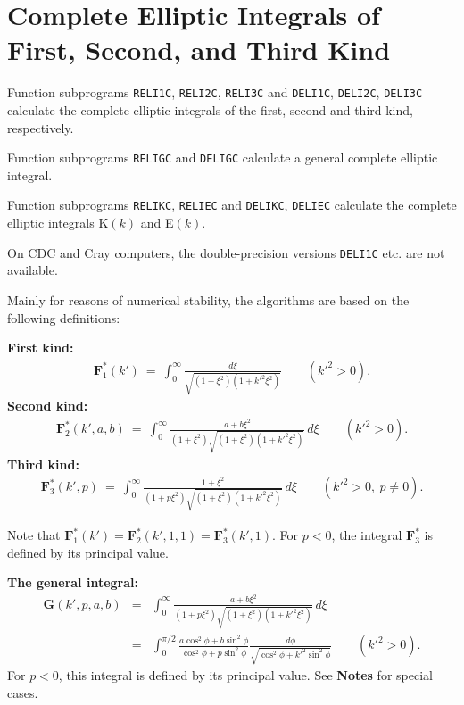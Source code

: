 \documentclass[]{article}
\begin{document}
\section{Complete Elliptic Integrals of First, Second, and Third
Kind}
Function subprograms \texttt{RELI1C}, \texttt{RELI2C}, \texttt{RELI3C}
and \texttt{DELI1C}, \texttt{DELI2C}, \texttt{DELI3C} calculate
the complete elliptic integrals of the first, second and
third kind, respectively.

Function subprograms \texttt{RELIGC} and \texttt{DELIGC} calculate a general
complete elliptic integral.

Function subprograms \texttt{RELIKC}, \texttt{RELIEC} and \texttt{DELIKC},
\texttt{DELIEC} calculate the complete elliptic integrals K$(k)$ and
E$(k)$.

On CDC and Cray computers, the double-precision versions \texttt{DELI1C}
etc. are not available.

Mainly for reasons of numerical stability, the algorithms are based on
the following definitions:

\textbf{First kind:}
\begin{eqnarray*}
\mathbf{F}_1^*(k') \ = \  \displaystyle
\int_0^\infty \frac{d\xi}{\sqrt{(1+\xi^2)(1+{k'}^2\xi^2)}}
\qquad ({k'}^2 > 0).
\end{eqnarray*}
\textbf{Second kind:}
\begin{eqnarray*}
\mathbf{F}_2^*(k',a,b) \ = \ \displaystyle
\int_0^\infty \frac{a+b\xi^2}{(1+\xi^2)\sqrt{(1+\xi^2)(1+{k'}^2\xi^2)}}
\, d\xi \qquad ({k'}^2 > 0).
\end{eqnarray*}
\textbf{Third kind:}
\begin{eqnarray*}
\mathbf{F}_3^*(k',p) \ = \ \displaystyle
\int_0^\infty \frac{1+\xi^2}{(1+p\xi^2)\sqrt{(1+\xi^2)(1+{k'}^2\xi^2)}}
\, d\xi \qquad ({k'}^2 > 0, \ p \ne 0).
\end{eqnarray*}

Note that $\mathbf{F}_1^*(k') = \mathbf{F}_2^*(k',1,1) =
\mathbf{F}_3^*(k',1)$. For $p < 0$, the integral $\mathbf{F}_3^*$ is
defined by its principal value.

\textbf{The general integral:}
\begin{eqnarray*}
\mathbf{G}(k',p,a,b) & = & \displaystyle
\int_0^\infty \frac{a+b\xi^2}{(1+p\xi^2)\sqrt{(1+\xi^2)(1+{k'}^2\xi^2)}}
\, d\xi  \\[3mm]
& = & \displaystyle \int_0^{\pi/2} \frac{a \cos^2 \phi + b \sin^2 \phi}
{\cos^2 \phi + p \sin^2 \phi} \frac{d\phi}
{\sqrt{\cos^2 \phi + {k'}^2 \sin^2 \phi}} \qquad ({k'}^2 > 0).
\end{eqnarray*}
For $p < 0$, this integral is defined by its principal value.
See \textbf{Notes} for special cases.
\end{document}
